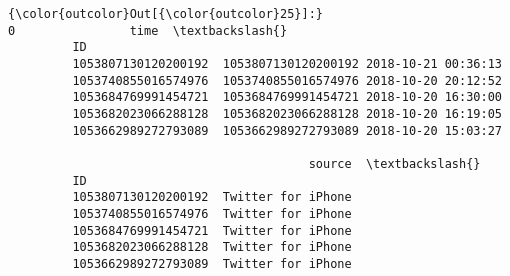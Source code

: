 \documentclass[11pt]{article}
\begin{document}
\begin{Verbatim}[commandchars=\\\{\}]
{\color{outcolor}Out[{\color{outcolor}25}]:}                                        0                time  \textbackslash{}
         ID                                                             
         1053807130120200192  1053807130120200192 2018-10-21 00:36:13   
         1053740855016574976  1053740855016574976 2018-10-20 20:12:52   
         1053684769991454721  1053684769991454721 2018-10-20 16:30:00   
         1053682023066288128  1053682023066288128 2018-10-20 16:19:05   
         1053662989272793089  1053662989272793089 2018-10-20 15:03:27   
         
                                          source  \textbackslash{}
         ID                                        
         1053807130120200192  Twitter for iPhone   
         1053740855016574976  Twitter for iPhone   
         1053684769991454721  Twitter for iPhone   
         1053682023066288128  Twitter for iPhone   
         1053662989272793089  Twitter for iPhone   
         

\end{Verbatim}
\end{document}
